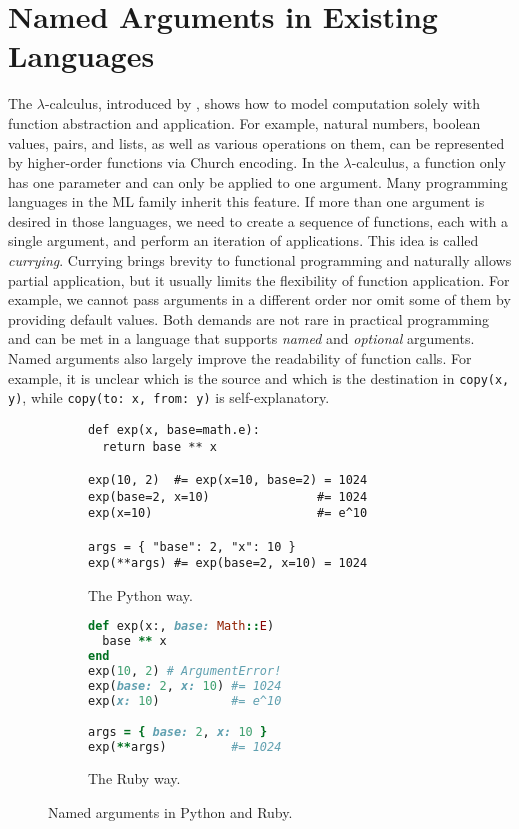 \section{Named Arguments in Existing Languages} \label{sec:existing}

The $\lambda$-calculus, introduced by \citet{church1941calculi}, shows how to
model computation solely with function abstraction and application. For example,
natural numbers, boolean values, pairs, and lists, as well as various operations
on them, can be represented by higher-order functions via Church encoding. In
the $\lambda$-calculus, a function only has one parameter and can only be
applied to one argument. Many programming languages in the ML family inherit
this feature. If more than one argument is desired in those languages, we need
to create a sequence of functions, each with a single argument, and perform an
iteration of applications. This idea is called \emph{currying}. Currying brings
brevity to functional programming and naturally allows partial application, but
it usually limits the flexibility of function application. For example, we
cannot pass arguments in a different order nor omit some of them by providing
default values. Both demands are not rare in practical programming and can be
met in a language that supports \emph{named} and \emph{optional} arguments.
Named arguments also largely improve the readability of function calls. For
example, it is unclear which is the source and which is the destination in
\lstinline{copy(x, y)}, while \lstinline{copy(to: x, from: y)} is
self-explanatory.

\begin{figure}
\begin{subfigure}{0.5\textwidth}
\begin{lstlisting}[language={[3]Python}]
def exp(x, base=math.e):
  return base ** x

exp(10, 2)  #= exp(x=10, base=2) = 1024
exp(base=2, x=10)               #= 1024
exp(x=10)                       #= e^10

args = { "base": 2, "x": 10 }
exp(**args) #= exp(base=2, x=10) = 1024
\end{lstlisting}
\caption{The Python way.} \label{fig:python}
\end{subfigure}
\hfill
\begin{subfigure}{0.35\textwidth}
\begin{lstlisting}[language=Ruby]
def exp(x:, base: Math::E)
  base ** x
end
exp(10, 2) # ArgumentError!
exp(base: 2, x: 10) #= 1024
exp(x: 10)          #= e^10

args = { base: 2, x: 10 }
exp(**args)         #= 1024
\end{lstlisting}
\caption{The Ruby way.} \label{fig:ruby}
\end{subfigure}
\caption{Named arguments in Python and Ruby.} \label{fig:python-ruby}
\end{figure}

